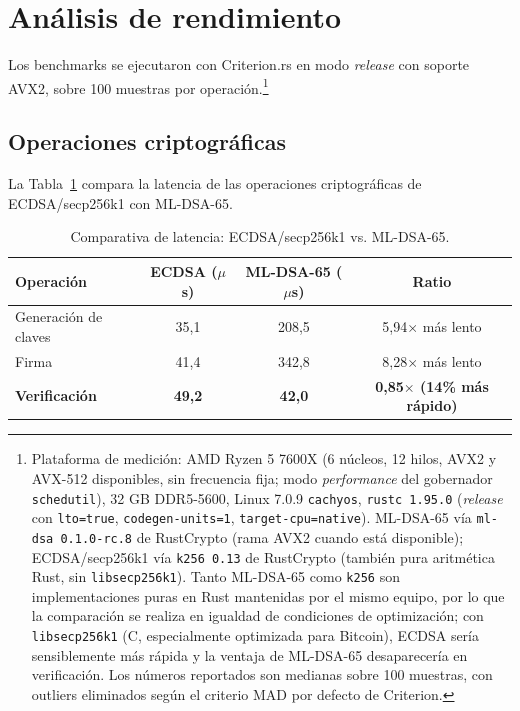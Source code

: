 \section{Análisis de rendimiento}
\label{sec:res_performance}

Los benchmarks se ejecutaron con Criterion.rs en modo \emph{release} con soporte AVX2, sobre 100 muestras por operación.\footnote{Plataforma de medición: AMD Ryzen 5 7600X (6 núcleos, 12 hilos, AVX2 y AVX-512 disponibles, sin frecuencia fija; modo \emph{performance} del gobernador \texttt{schedutil}), 32 GB DDR5-5600, Linux 7.0.9 \texttt{cachyos}, \texttt{rustc 1.95.0} (\emph{release} con \texttt{lto=true}, \texttt{codegen-units=1}, \texttt{target-cpu=native}). ML-DSA-65 vía \texttt{ml-dsa 0.1.0-rc.8} de RustCrypto (rama AVX2 cuando está disponible); ECDSA/secp256k1 vía \texttt{k256 0.13} de RustCrypto (también pura aritmética Rust, sin \texttt{libsecp256k1}). Tanto ML-DSA-65 como \texttt{k256} son implementaciones puras en Rust mantenidas por el mismo equipo, por lo que la comparación se realiza en igualdad de condiciones de optimización; con \texttt{libsecp256k1} (C, especialmente optimizada para Bitcoin), ECDSA sería sensiblemente más rápida y la ventaja de ML-DSA-65 desaparecería en verificación. Los números reportados son medianas sobre 100 muestras, con outliers eliminados según el criterio MAD por defecto de Criterion.}

\subsection{Operaciones criptográficas}

La Tabla~\ref{tab:crypto_bench} compara la latencia de las operaciones criptográficas de ECDSA/secp256k1 con ML-DSA-65.

\begin{table}[htbp]
\centering
\caption{Comparativa de latencia: ECDSA/secp256k1 vs. ML-DSA-65.}
\label{tab:crypto_bench}
\begin{tabular}{@{}lccc@{}}
\toprule
\textbf{Operación} & \textbf{ECDSA ($\mu$s)} & \textbf{ML-DSA-65 ($\mu$s)} & \textbf{Ratio} \\
\midrule
Generación de claves & 35,1 & 208,5 & 5,94$\times$ más lento \\
Firma & 41,4 & 342,8 & 8,28$\times$ más lento \\
\textbf{Verificación} & \textbf{49,2} & \textbf{42,0} & \textbf{0,85$\times$ (14\% más rápido)} \\
\bottomrule
\end{tabular}
\end{table}

